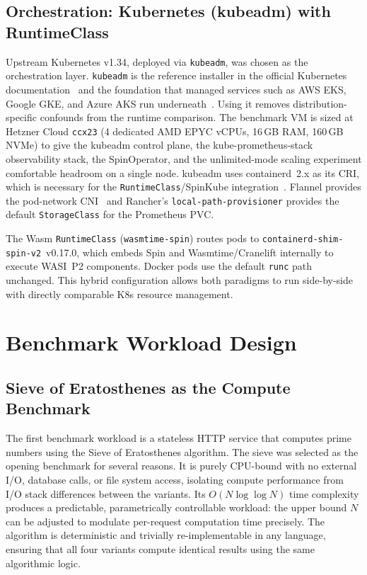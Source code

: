 \subsection{Orchestration: Kubernetes (kubeadm) with RuntimeClass}

\begin{sloppypar}
Upstream Kubernetes v1.34, deployed via \texttt{kubeadm}, was chosen as the orchestration layer. \texttt{kubeadm} is the reference installer in the official Kubernetes documentation~\cite{k8s2024architecture} and the foundation that managed services such as \acs{AWS} \acs{EKS}, Google \acs{GKE}, and Azure \acs{AKS} run underneath~\cite{k8s2024architecture}. Using it removes distribution-specific confounds from the runtime comparison. The benchmark \acs{VM} is sized at Hetzner Cloud \texttt{ccx23} (4 dedicated \acs{AMD} \acs{EPYC} vCPUs, 16\,\acs{GB} \acs{RAM}, 160\,\acs{GB} \acs{NVMe}) to give the kubeadm control plane, the kube-prometheus-stack observability stack, the SpinOperator, and the unlimited-mode scaling experiment comfortable headroom on a single node. kubeadm uses containerd~2.x as its \acs{CRI}, which is necessary for the \texttt{RuntimeClass}/SpinKube integration~\cite{spinkube2024, runwasi2024}. Flannel provides the pod-network \acs{CNI}~\cite{flannel2024} and Rancher's \texttt{local-path-provisioner} provides the default \texttt{StorageClass} for the Prometheus \acs{PVC}.
\end{sloppypar}

\begin{sloppypar}
The \acs{Wasm} \texttt{RuntimeClass} (\texttt{wasmtime-spin}) routes pods to \texttt{containerd-shim-spin-v2}~v0.17.0, which embeds Spin and Wasmtime/Cranelift internally to execute \acs{WASI}~P2 components. Docker pods use the default \texttt{runc} path unchanged. This hybrid configuration allows both paradigms to run side-by-side with directly comparable \acs{K8s} resource management.
\end{sloppypar}

\section{Benchmark Workload Design}
\label{sec:workload_design}

\subsection{Sieve of Eratosthenes as the Compute Benchmark}

The first benchmark workload is a stateless \acs{HTTP} service that computes prime numbers using the Sieve of Eratosthenes algorithm. The sieve was selected as the opening benchmark for several reasons. It is purely \acs{CPU}-bound with no external I/O, database calls, or file system access, isolating compute performance from I/O stack differences between the variants. Its $O(N \log \log N)$ time complexity produces a predictable, parametrically controllable workload: the upper bound $N$ can be adjusted to modulate per-request computation time precisely. The algorithm is deterministic and trivially re-implementable in any language, ensuring that all four variants compute identical results using the same algorithmic logic.


